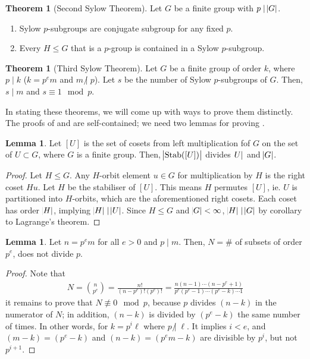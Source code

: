 \documentclass[11pt]{amsart} %
\theoremstyle{definition}
\newtheorem{theorem}[definition]{Theorem}
\newtheorem{lemma}[definition]{Lemma}
\theoremstyle{definition}
\DeclareMathOperator{\stab}{Stab}
\DeclareMathOperator{\notdiv}{\not|}
\numberwithin{equation}{section}
\begin{document}
\begin{theorem}[Second Sylow Theorem]
	\label{thmsylowsecond}
	Let $G$ be a finite group with $p \mid \abs{G}$.
	
	\begin{enumerate}
		\item Sylow $p$-subgroups are conjugate subgroup for any fixed $p$.
		\item Every $H \leq G$ that is a $p$-group is contained in a Sylow $p$-subgroup.
	\end{enumerate}
\end{theorem}


\begin{theorem}[Third Sylow Theorem]
	\label{thmsylowthird}
	Let $G$ be a finite group of order $k$, where $p \mid k$ ($k = p^e m$ and $m \notdiv p$). Let $s$ be the number of Sylow $p$-subgroups of $G$. Then, $s \mid m$ and $s \equiv 1 \mod p$.
\end{theorem}


In stating these theorems, we will come up with ways to prove them distinctly. The proofs of  and  are self-contained; we need two lemmas for proving .

\begin{lemma}
	\label{lemstabUorder}
	Let $[U]$ is the set of cosets from left multiplication fof $G$ on the set of $U \subset G$, where $G$ is a finite group. Then, $\abs{\stab([U])} $ divides $\abs{U}$ and $\abs{G}$.
\end{lemma}

\begin{proof}
	Let $H \leq G$. Any $H$-orbit element $u \in G$ for multiplication by $H$ is the right coset $Hu$. Let $H$ be the stabiliser of $[U]$. This means $H$ permutes $[U]$, ie. $U$ is partitioned into $H$-orbits, which are the aforementioned right cosets. Each coset has order $\abs{H}$, implying $\abs{H} \mid \abs{U}$. Since $H \leq G$ and $\abs{G} < \infty$, $\abs{H} \mid \abs{G}$ by corollary to Lagrange's theorem.
\end{proof}


\begin{lemma}
	\label{lemsubsetssylowpsubgroups}
	Let $n = p^e m$ for all $e > 0$ and $p \mid m$. Then, $N = \# $ of subsets of order $p^e$, does not divide $p$.
\end{lemma}

\begin{proof}
	Note that
	\begin{align*}
	N = \binom{n}{p^e} = \frac{n!}{(n-p^e)! (p^e)!} = \frac{n(n-1) \cdots (n-p^e+1)}{p^e (p^e - 1) \cdots (p^e - k) \cdots 1}
	\end{align*}
	it remains to prove that $N \not\equiv 0 \mod p$, because $p$ divides $(n-k)$ in the numerator of $N$; in addition, $(n-k)$ is divided by $(p^e - k)$ the same number of times. In other words, for $k = p^i \ell$ where $p \notdiv \ell$. It implies $i < e$, and $(m-k) = (p^e - k)$ and $(n-k) = (p^e m - k)$ are divisible by $p^i$, but not $p^{i+1}$.
\end{proof}
\end{document}
